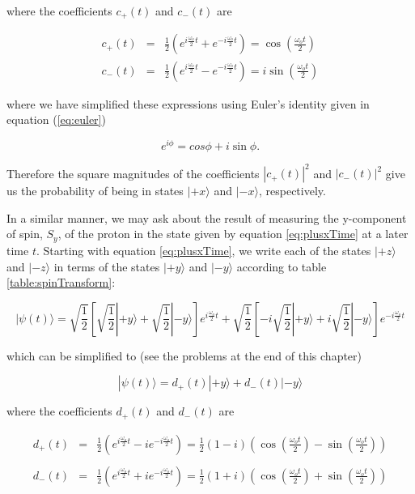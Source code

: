 \noindent where the coefficients $c_+(t)$ and $c_-(t)$ are

\begin{eqnarray}
c_+(t) & = & \frac{1}{2} \left( e^{i\frac{\omega_o}{2}t} + e^{-i\frac{\omega_o}{2}t} \right) = \cos{\left(\frac{\omega_o t}{2}\right)} \nonumber \\ 
c_-(t) & = & \frac{1}{2} \left( e^{i\frac{\omega_o}{2}t} - e^{-i\frac{\omega_o}{2}t} \right)= i \sin{\left(\frac{\omega_o t}{2}\right)}
\label{eq:c-coefficients}
\end{eqnarray}

\noindent where we have simplified these expressions using Euler's identity given in equation (\ref{eq:euler}) 

\begin{equation}
e^{i\phi} = cos\phi + i\sin\phi .
\end{equation}

\noindent Therefore the square magnitudes of the coefficients $|c_+(t)|^2$ and $|c_-(t)|^2$
give us the probability of being in states $|\mbox{$+x$}\rangle$ and $|\mbox{$-x$}\rangle$, respectively.

In a similar manner, we may ask about the result of measuring the y-component of spin, $S_y$, of the proton in the state given by equation \ref{eq:plusxTime} at a later time $t$.  Starting with equation \ref{eq:plusxTime}, we write each of the states $|\mbox{$+z$}\rangle$ and $|\mbox{$-z$}\rangle$ in terms of the states $|\mbox{$+y$}\rangle$ and $|\mbox{$-y$}\rangle$ according to table \ref{table:spinTransform}:

\begin{equation}
|\mbox{$\psi(t)$}\rangle = \sqrt{\frac{1}{2}} \left[ \sqrt{\frac{1}{2}} |\mbox{$+y$}\rangle + \sqrt{\frac{1}{2}} |\mbox{$-y$}\rangle \right]  e^{i\frac{\omega_o}{2}t} + \sqrt{\frac{1}{2}} \left[ -i\sqrt{\frac{1}{2}} |\mbox{$+y$}\rangle +i\sqrt{\frac{1}{2}}|\mbox{$-y$}\rangle \right] e^{-i\frac{\omega_o}{2}t}
\end{equation}

\noindent which can be simplified to (see the problems at the end of this chapter)

\begin{equation}
|\mbox{$\psi(t)$}\rangle = d_+(t) |\mbox{$+y$}\rangle + d_-(t) |\mbox{$-y$}\rangle
\end{equation}

\noindent where the coefficients $d_+(t)$ and $d_-(t)$ are

\begin{eqnarray}
d_+(t)&=&\frac{1}{2} \left( e^{i\frac{\omega_o}{2}t} -i e^{-i\frac{\omega_o}{2}t} \right) = \frac{1}{2} (1-i) \left( \cos{\left(\frac{\omega_o t}{2} \right)} - \sin{\left(\frac{\omega_o t}{2} \right)}\right) \nonumber \\
 & & \\
d_-(t)&=&\frac{1}{2} \left( e^{i\frac{\omega_o}{2}t} +i e^{-i\frac{\omega_o}{2}t} \right) = \frac{1}{2} (1+i) \left( \cos{\left(\frac{\omega_o t}{2} \right)} + \sin{\left(\frac{\omega_o t}{2} \right)}\right) \nonumber
\label{eq:d-coefficients}
\end{eqnarray}

